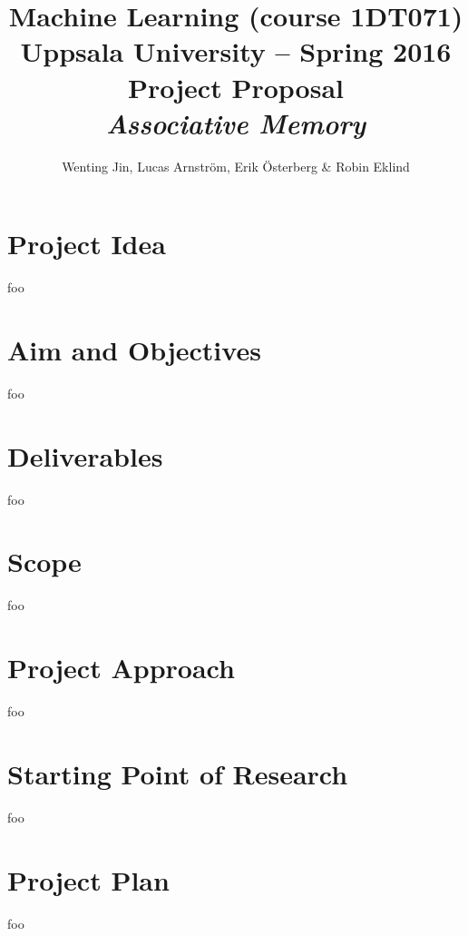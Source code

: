 \documentclass[12pt, a4paper]{article}
\title{\textbf{Machine Learning (course 1DT071) \\
    Uppsala University -- Spring 2016 \\
    Project Proposal \\
    \textit{Associative Memory}
  }
}
\author{Wenting Jin, Lucas Arnström, Erik Österberg \& Robin Eklind}
\begin{document}
\maketitle



\section{Project Idea} %



foo

\section{Aim and Objectives}

foo

\section{Deliverables}



foo

\section{Scope}


foo

\section{Project Approach}


foo

\section{Starting Point of Research}

foo

\section{Project Plan}

foo
\end{document}
